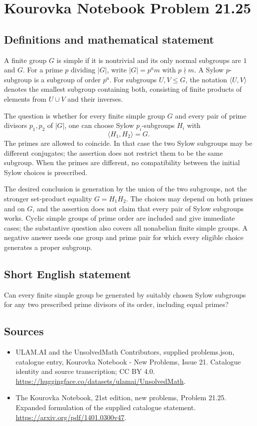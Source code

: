 \documentclass[11pt,a4paper]{article}
\begin{document}
\section*{Kourovka Notebook Problem 21.25}\label{statement}

\subsection{Definitions and mathematical statement}
A finite group $G$ is simple if it is nontrivial and its only normal
subgroups are $1$ and $G$. For a prime $p$ dividing $|G|$, write
$|G|=p^a m$ with $p\nmid m$. A Sylow $p$-subgroup is a subgroup of
order $p^a$. For subgroups $U,V\le G$, the notation $\langle U,V\rangle$
denotes the smallest subgroup containing both, consisting of finite
products of elements from $U\cup V$ and their inverses.

The question is whether for every finite simple group $G$ and every
pair of prime divisors $p_1,p_2$ of $|G|$, one can choose Sylow
$p_i$-subgroups $H_i$ with
\[
 \langle H_1,H_2\rangle=G.
\]
The primes are allowed to coincide. In that case the two Sylow subgroups
may be different conjugates; the assertion does not restrict them to be
the same subgroup. When the primes are different, no compatibility
between the initial Sylow choices is prescribed.

The desired conclusion is generation by the union of the two subgroups,
not the stronger set-product equality $G=H_1H_2$. The choices may depend
on both primes and on $G$, and the assertion does not claim that every
pair of Sylow subgroups works. Cyclic simple groups of prime order are
included and give immediate cases; the substantive question also covers
all nonabelian finite simple groups. A negative answer needs one group
and prime pair for which every eligible choice generates a proper subgroup.
\subsection{Short English statement}
Can every finite simple group be generated by suitably chosen Sylow subgroups for any two prescribed prime divisors of its order, including equal primes?
\subsection{Sources}
\begin{itemize}
\item[S1] ULAM.AI and the UnsolvedMath Contributors, supplied problems.json, catalogue entry, Kourovka Notebook - New Problems, Issue 21. Catalogue identity and source transcription; CC BY 4.0.
\url{https://huggingface.co/datasets/ulamai/UnsolvedMath}.
\item[S2] The Kourovka Notebook, 21st edition, new problems, Problem 21.25. Expanded formulation of the supplied catalogue statement.
\url{https://arxiv.org/pdf/1401.0300v47}.
\end{itemize}
\end{document}
